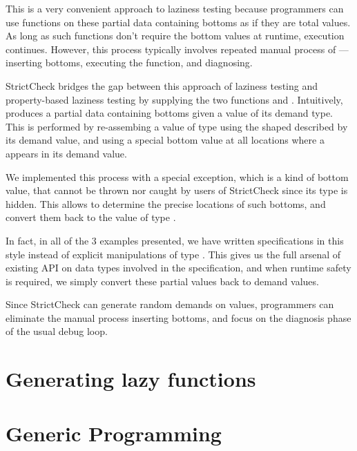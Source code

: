 \documentclass[acmsmall,review]{acmart}\settopmatter{}
\begin{document}
This is a very convenient approach to laziness testing because
programmers can use functions on these partial data containing bottoms
as if they are total values. As long as such functions don't require
the bottom values at runtime, execution continues. However, this
process typically involves repeated manual process of --- inserting
bottoms, executing the function, and diagnosing.

StrictCheck bridges the gap between this approach of laziness testing
and property-based laziness testing by supplying the two
functions  and . Intuitively,  produces a partial data
containing bottoms given a value of its demand type. This is performed
by re-assembing a value of type  using the shaped described by
its demand value, and using a special bottom value at all locations
where a  appears in its demand value.

We implemented this process with a special exception, which is a kind
of bottom value, that cannot be thrown nor caught by users of
StrictCheck since its type is hidden. This allows  to
determine the precise locations of such bottoms, and convert them back
to the  value of type .

In fact, in all of the 3 examples presented, we have written
specifications in this style instead of explicit manipulations of
type . This gives us the full arsenal of existing API on
data types involved in the specification, and when runtime safety is
required, we simply convert these partial values back to demand
values.

Since StrictCheck can generate random demands on values, programmers
can eliminate the manual process inserting bottoms, and focus on the
diagnosis phase of the usual debug loop.

\section{Generating lazy functions}
\label{sec:gen-lazy-fun}

\section{Generic Programming}
\label{sec:generic-programming}
\end{document}
